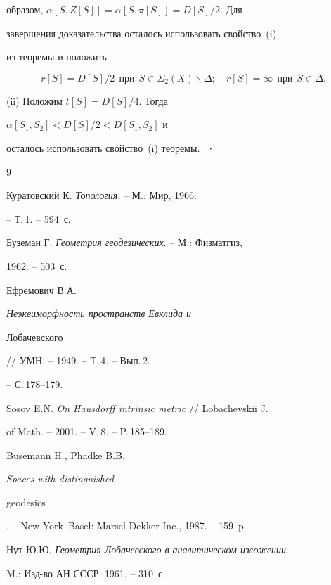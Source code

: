 образом, $\alpha [S,Z[S]] = \alpha [S,\pi[S]] = D[S]/2$. Для


завершения доказательства осталось использовать свойство~(i)


из теоремы и положить


$$


r[S]= D[S]/2\ \ \text{при}\ \  S \in \Sigma_{2}


(X)\backslash\Delta;\quad r[S]= \infty\ \ \text{при}\ \ S \in \Delta.


$$





(ii) Положим  $t[S]= D[S]/4$. Тогда


$\alpha [S_{1},S_{2}] < D[S]/2 < D[S_{1},S_{2}]$ и


осталось использовать свойство~(i) теоремы.$\quad\square$





\begin{thebibliography}{9}





 Куратовский К. {\em Топология}. -- М.: Мир, 1966.


-- Т.\,1.  -- 594~с.





 Буземан Г. {\em Геометрия геодезических}. -- М.: Физматгиз,


1962. -- 503~с.





 Ефремович В.А. {\em Неэквиморфность пространств Евклида и


Лобачевского} // УМН. -- 1949. -- Т.\,4. -- Вып.\,2.


-- С.\,178--179.





 Sosov E.N. {\em On Hausdorff intrinsic metric} // Lobachevskii J.


of Math. -- 2001. -- V.\,8. -- P.\,185--189.





 Busemann H., Phadke B.B. {\em Spaces with distinguished


geodesics}. -- New York--Basel: Marsel Dekker Inc., 1987. -- 159~p.





 Нут Ю.Ю. {\em Геометрия Лобачевского в аналитическом изложении}. --


M.: Изд-во АН СССР, 1961. -- 310~с.








\end{thebibliography}





\vskip 2cm












\label{end}





